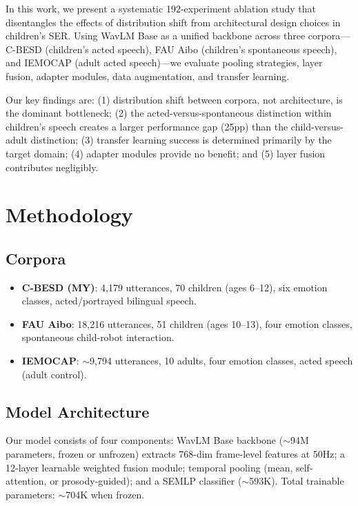 \documentclass[11pt,a4paper]{article}
\begin{document}
In this work, we present a systematic 192-experiment ablation study that disentangles the effects of distribution shift from architectural design choices in children's SER. Using WavLM Base as a unified backbone across three corpora---C-BESD (children's acted speech), FAU Aibo (children's spontaneous speech), and IEMOCAP (adult acted speech)---we evaluate pooling strategies, layer fusion, adapter modules, data augmentation, and transfer learning.

Our key findings are: (1) distribution shift between corpora, not architecture, is the dominant bottleneck; (2) the acted-versus-spontaneous distinction within children's speech creates a larger performance gap (25pp) than the child-versus-adult distinction; (3) transfer learning success is determined primarily by the target domain; (4) adapter modules provide no benefit; and (5) layer fusion contributes negligibly.

\section{Methodology}

\subsection{Corpora}

\begin{itemize}
    \item \textbf{C-BESD (MY)}: 4,179 utterances, 70 children (ages 6--12), six emotion classes, acted/portrayed bilingual speech.
    \item \textbf{FAU Aibo}: 18,216 utterances, 51 children (ages 10--13), four emotion classes, spontaneous child-robot interaction.
    \item \textbf{IEMOCAP}: $\sim$9,794 utterances, 10 adults, four emotion classes, acted speech (adult control).
\end{itemize}

\subsection{Model Architecture}

Our model consists of four components: WavLM Base backbone ($\sim$94M parameters, frozen or unfrozen) extracts 768-dim frame-level features at 50Hz; a 12-layer learnable weighted fusion module; temporal pooling (mean, self-attention, or prosody-guided); and a SEMLP classifier ($\sim$593K). Total trainable parameters: $\sim$704K when frozen.
\end{document}

